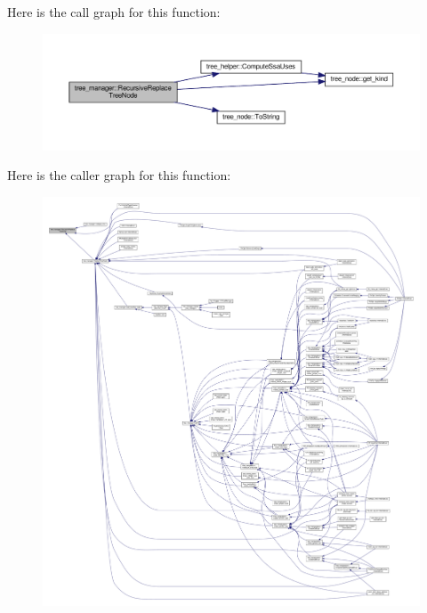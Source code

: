 Here is the call graph for this function\+:
\nopagebreak
\begin{figure}[H]
\begin{center}
\leavevmode
\includegraphics[width=350pt]{d2/ddd/classtree__manager_a667fbe393ae2af64dab9240f92134c5b_cgraph}
\end{center}
\end{figure}
Here is the caller graph for this function\+:
\nopagebreak
\begin{figure}[H]
\begin{center}
\leavevmode
\includegraphics[width=350pt]{d2/ddd/classtree__manager_a667fbe393ae2af64dab9240f92134c5b_icgraph}
\end{center}
\end{figure}
\mbox{\label{classtree__manager_af0410e1ad992f9995223f187563e0289}} 
